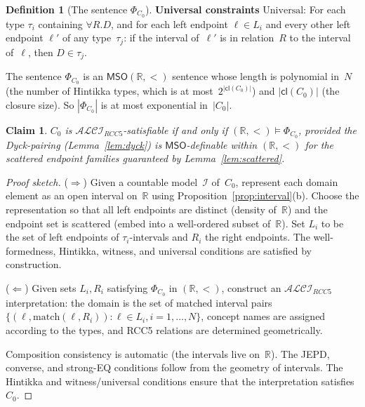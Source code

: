 \documentclass[a4paper,11pt]{article}
\newtheorem{claim}[theorem]{Claim}
\theoremstyle{definition}
\newtheorem{definition}[theorem]{Definition}
\newcommand{\ALCIRCC}[1]{\ensuremath{\mathcal{ALCI}_{\mathit{RCC#1}}}}
\newcommand{\interp}{\ensuremath{\mathcal{I}}}
\newcommand{\cl}{\ensuremath{\mathsf{cl}}}
\newcommand{\MSO}{\ensuremath{\mathsf{MSO}}}
\newcommand{\reals}{\ensuremath{\mathbb{R}}}
\begin{document}
\begin{definition}[The sentence $\Phi_{C_0}$]
\smallskip\noindent
\textbf{Universal constraints} $\mathrm{Universal}$:\;
For each type $\tau_i$ containing $\forall R.D$, and for each left
endpoint $\ell \in L_i$ and every other left endpoint $\ell'$ of
any type~$\tau_j$: if the interval of~$\ell'$ is in relation~$R$
to the interval of~$\ell$, then $D \in \tau_j$.
\end{definition}

\medskip

The sentence $\Phi_{C_0}$ is an $\MSO(\reals, <)$ sentence whose
length is polynomial in~$N$ (the number of Hintikka types, which is
at most~$2^{|\cl(C_0)|}$) and $|\cl(C_0)|$ (the closure size).  So
$|\Phi_{C_0}|$ is at most exponential in~$|C_0|$.

\begin{claim}
\label{claim:correctness}
$C_0$ is $\ALCIRCC{5}$-satisfiable if and only if
$(\reals, <) \models \Phi_{C_0}$, provided the Dyck-pairing
\textup{(}Lemma~\ref{lem:dyck}\textup{)} is $\MSO$-definable within
$(\reals, <)$ for the scattered endpoint families guaranteed by
Lemma~\ref{lem:scattered}.
\end{claim}

\begin{proof}[Proof sketch]
($\Rightarrow$)\; Given a countable model~$\interp$ of~$C_0$, represent
each domain element as an open interval on~$\reals$ using
Proposition~\ref{prop:interval}(b).  Choose the representation so
that all left endpoints are distinct (density of~$\reals$) and the
endpoint set is scattered (embed into a well-ordered subset
of~$\reals$).  Set $L_i$ to be the set of left endpoints of
$\tau_i$-intervals and $R_i$ the right endpoints.
The well-formedness, Hintikka, witness, and universal conditions
are satisfied by construction.

($\Leftarrow$)\; Given sets $L_i, R_i$ satisfying $\Phi_{C_0}$ in
$(\reals, <)$, construct an $\ALCIRCC{5}$ interpretation: the domain
is the set of matched interval pairs $\{(\ell, \mathrm{match}(\ell,
R_i)) : \ell \in L_i, i = 1, \ldots, N\}$, concept names are
assigned according to the types, and RCC5 relations are determined
geometrically.

Composition consistency is automatic (the intervals live on~$\reals$).
The JEPD, converse, and strong-EQ conditions follow from the
geometry of intervals.  The Hintikka and witness/universal conditions
ensure that the interpretation satisfies~$C_0$.
\end{proof}

\end{document}
